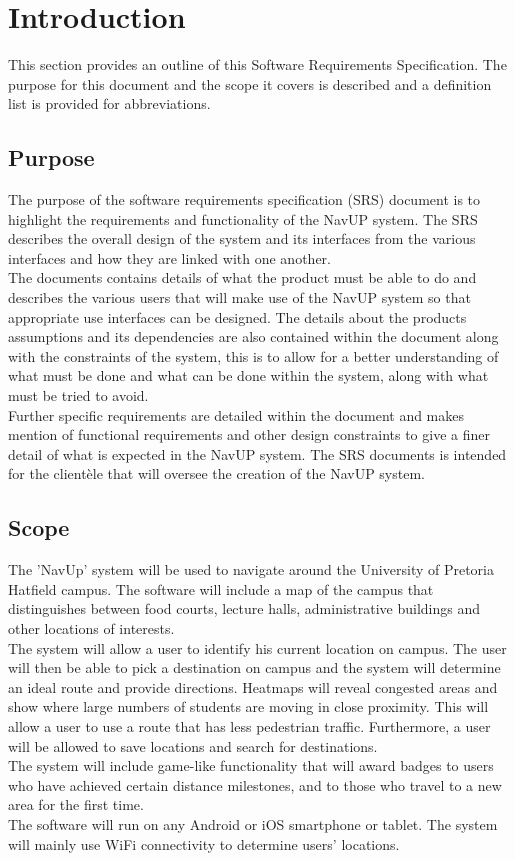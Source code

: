 \documentclass[a4paper,12pt]{article}
\begin{document}
\newpage
\section{Introduction}
This section provides an outline of this Software Requirements Specification. The purpose for this document and the scope it covers is described and a definition list is provided for abbreviations.
\subsection{Purpose}
The purpose of the software requirements specification (SRS) document is to highlight the requirements and functionality of the NavUP system. The SRS describes the overall design of the system and its interfaces from the various interfaces and how they are linked with one another.\\
The documents contains details of what the product must be able to do and describes the various users that will make use of the NavUP system so that appropriate use interfaces can be designed. The details about the products assumptions and its dependencies are also contained within the document along with the constraints of the system, this is to allow for a better understanding of what must be done and what can be done within the system, along with what must be tried to avoid.\\
Further specific requirements are detailed within the document and makes mention of functional requirements and other design constraints to give a finer detail of what is expected in the NavUP system. The SRS documents is intended for the clientèle that will oversee the creation of the NavUP system.
\subsection{Scope}
The 'NavUp' system will be used to navigate around the University of Pretoria Hatfield campus. The software will include a map of the campus that distinguishes between food courts, lecture halls, administrative buildings and other locations of interests.\\
The system will allow a user to identify his current location on campus. The user will then be able to pick a destination on campus and the system will determine an ideal route and provide directions. Heatmaps will reveal congested areas and show where large numbers of students are moving in close proximity. This will allow a user to use a route that has less pedestrian traffic. Furthermore, a user will be allowed to save locations and search for destinations.\\
The system will include game-like functionality that will award badges to users who have achieved certain distance milestones, and to those who travel to a new area for the first time.\\
The software will run on any Android or iOS smartphone or tablet. The system will mainly use WiFi connectivity to determine users' locations.
\end{document}
